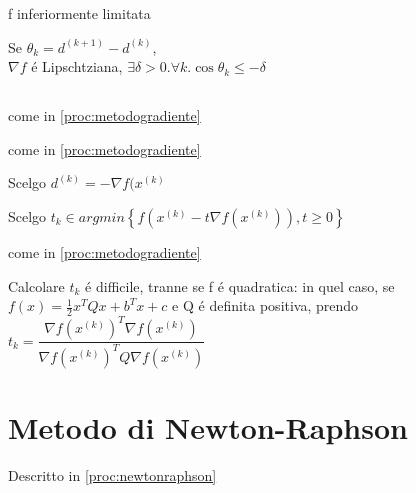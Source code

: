 \askip


\askip

 f inferiormente limitata

\askip

Se $ \theta_k = d^{(k+1)} - d^{(k)} $, \\
 $ \nabla f $ \'e Lipschtziana, $ \exists \delta > 0. \forall k. \cos \theta_k \leq - \delta $

\subsection{}



\begin{proc}
\item come in \ref{proc:metodogradiente}
\item come in \ref{proc:metodogradiente}
\item Scelgo $ d^{(k)} = - \nabla f(x^{(k)} $
\item Scelgo $ t_k \in argmin \left\lbrace f(x^{(k)} - t \nabla f(x^{(k)})), t \geq 0 \right\rbrace $
\item come in \ref{proc:metodogradiente}
\end{proc}

\askip


\askip

Calcolare $ t_k $ \'e difficile, tranne se f \'e quadratica: in quel caso, se $ f(x) = \frac{1}{2} x^T Q x + b^T x + c $ e Q \'e definita positiva, prendo $ t_k = \dfrac{\nabla f(x^{(k)})^T \nabla f(x^{(k)})}{\nabla f(x^{(k)})^T Q \nabla f(x^{(k)})} $

\section{Metodo di Newton-Raphson}
Descritto in \ref{proc:newtonraphson}

